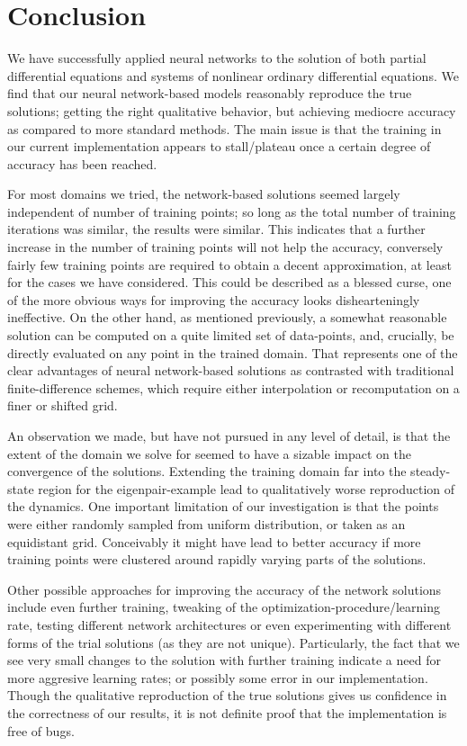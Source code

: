 \documentclass[reprint, english, nofootinbib]{revtex4-2}
\begin{document}
\section{Conclusion}

We have successfully applied neural networks to the solution of both partial differential equations and systems of nonlinear ordinary differential equations. We find that our neural network-based models reasonably reproduce the true solutions; getting the right qualitative behavior, but achieving mediocre accuracy as compared to more standard methods. The main issue is that the training in our current implementation appears to stall/plateau once a certain degree of accuracy has been reached.

For most domains we tried, the network-based solutions seemed largely independent of number of training points; so long as the total number of training iterations was similar, the results were similar. This indicates that a further increase in the number of training points will not help the accuracy, conversely fairly few training points are required to obtain a decent approximation, at least for the cases we have considered. This could be described as a blessed curse, one of the more obvious ways for improving the accuracy looks dishearteningly ineffective. On the other hand, as mentioned previously, a somewhat reasonable solution can be computed on a quite limited set of data-points, and, crucially, be directly evaluated on any point in the trained domain. That represents one of the clear advantages of neural network-based solutions as contrasted with traditional finite-difference schemes, which require either interpolation or recomputation on a finer or shifted grid. 

An observation we made, but have not pursued in any level of detail, is that the extent of the domain we solve for seemed to have a sizable impact on the convergence of the solutions. Extending the training domain far into the steady-state region for the eigenpair-example lead to qualitatively worse reproduction of the dynamics. One important limitation of our investigation is that the points were either randomly sampled from uniform distribution, or taken as an equidistant grid. Conceivably it might have lead to better accuracy if more training points were clustered around rapidly varying parts of the solutions.

Other possible approaches for improving the accuracy of the network solutions include even further training, tweaking of the optimization-procedure/learning rate, testing different network architectures or even experimenting with different forms of the trial solutions (as they are not unique). Particularly, the fact that we see very small changes to the solution with further training indicate a need for more aggresive learning rates; or possibly some error in our implementation. Though the qualitative reproduction of the true solutions gives us confidence in the correctness of our results, it is not definite proof that the implementation is free of bugs.
\end{document}
